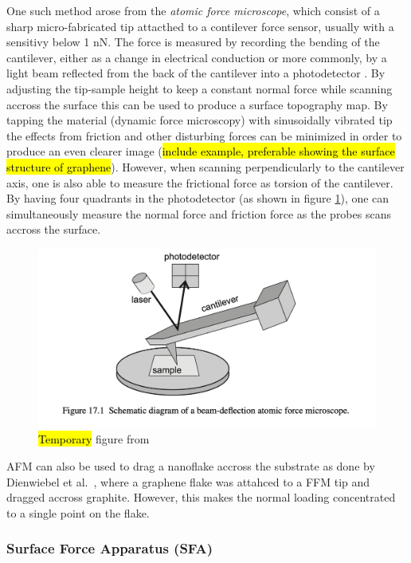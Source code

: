 One such method arose from the \textit{atomic force microscope}, which consist
of a sharp micro-fabricated tip attacthed to a contilever force sensor, usually
with a sensitivy below 1 nN. The force is measured by recording the bending of
the cantilever, either as a change in electrical conduction or more commonly, by
a light beam reflected from the back of the cantilever into a photodetector
\cite{gnecco_meyer_2015}. By adjusting the tip-sample height to keep a constant
normal force while scanning accross the surface this can be used to produce a
surface topography map. By tapping the material (dynamic force microscopy) with sinusoidally vibrated tip the effects from friction and other disturbing forces can be minimized in order to produce an even clearer image (\hl{include example, preferable showing the surface structure of graphene}). However, when scanning perpendicularly to the cantilever
axis, one is also able to measure the frictional force as torsion of the
cantilever. By having four quadrants in the photodetector (as shown in figure
\cref{fig:AFM}), one can simultaneously measure the normal force and friction
force as the probes scans accross the surface. 

\begin{figure}[H]
  \centering
  \includegraphics[width=0.6\linewidth]{figures/theory/AFM.png}
  \caption{\hl{Temporary} figure from \cite[p. 184]{gnecco_meyer_2015}}
  \label{fig:AFM}
\end{figure}


AFM can also be used to drag a nanoflake accross the substrate as done by Dienwiebel et al.\ \cite{DIENWIEBEL2005197}, where a graphene flake was attahced to a FFM tip and dragged accross graphite. However, this makes the normal loading concentrated to a single point on the flake. 



\subsubsection{Surface Force Apparatus (SFA)}

